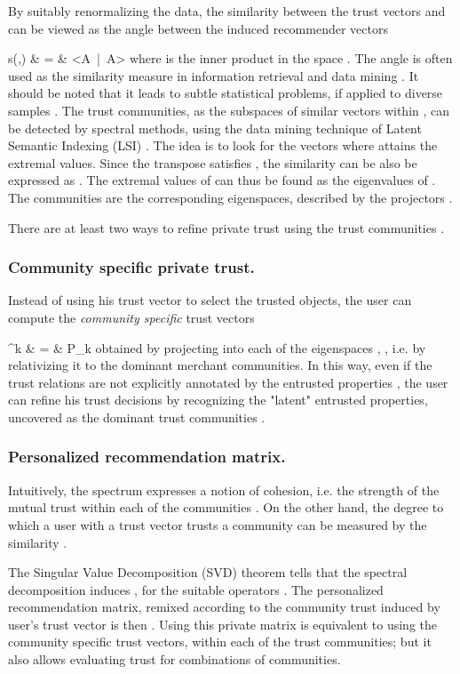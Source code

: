 \documentclass{llncs}
\newcommand{\Sim}{{\rm s}}
\newcommand{\bear}{}
\begin{document}
By suitably renormalizing the data, the similarity between the trust vectors  and  can be viewed as the angle between the induced recommender vectors
\bear
\Sim(\varphi,\psi) & = & <A\varphi\ |\ A\psi>
\eear
where  is the inner product in the space . The angle is often used as the similarity measure in information retrieval and data mining \cite{Raghavan:IR-book}. It should be noted that it leads to subtle statistical problems, if applied to diverse samples \cite{PavlovicD:QI08}. 
The trust communities, as the subspaces of similar vectors within , can be detected by spectral methods, using the data mining technique of Latent Semantic Indexing (LSI) \cite{LSI,kleinberg99authoritative,PavlovicD:QI08}. The idea is to look for the vectors  where  attains the extremal values. Since the transpose  satisfies , the similarity can be also be expressed as . The extremal values of  can thus be found as the eigenvalues   of . The communities are the corresponding eigenspaces, described by the projectors . 

There are at least two ways to refine private trust  using the trust communities . 

\subsubsection{Community specific private trust.}
Instead of using his trust vector  to select the trusted objects, the user can compute the {\em community specific\/} trust vectors
\bear
\tau^k & = & P_k \tau
\eear
obtained by projecting  into each of the eigenspaces , , i.e. by relativizing it to the dominant merchant communities. In this way, even if the trust relations  are not explicitly annotated by the entrusted properties , the user can refine his trust decisions by recognizing the "latent" entrusted properties,  uncovered as the dominant trust communities .

\subsubsection{Personalized recommendation matrix.}
Intuitively, the spectrum  expresses a notion of cohesion, i.e. the strength of the mutual trust within each of the communities 
. On the other hand, the degree to which a user with a trust vector  trusts a community  can be measured by the similarity 
.

The Singular Value Decomposition (SVD) theorem tells that the spectral decomposition  induces , for the suitable operators . The personalized recommendation matrix, remixed according to the community trust  induced by user's trust vector  is then . Using this private matrix is equivalent to using the community specific trust vectors, within each of the trust communities; but it also allows evaluating trust for  combinations of communities. 
\end{document}
